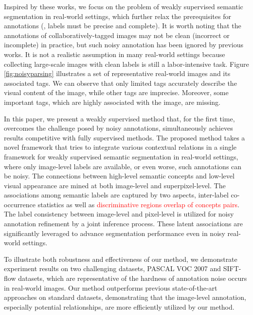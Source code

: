 Inspired by these works, we focus on the problem of weakly supervised semantic segmentation in real-world settings, which further relax the prerequisites for annotations (\eg, labels must be precise and complete). It is worth noting that the annotations of collaboratively-tagged images may not be clean (incorrect or incomplete) in practice, but such noisy annotation has been ignored by previous works. It is not a realistic assumption in many real-world settings because collecting large-scale images with clean labels is still a labor-intensive task. Figure \ref{fig:noisyparsing} illustrates a set of representative real-world images and its associated tags. We can observe that only limited tags accurately describe the visual content of the image, while other tags are imprecise. Moreover, some important tags, which are highly associated with the image, are missing.

In this paper, we present a weakly supervised method that, for the first time, overcomes the challenge posed by noisy annotations, simultaneously achieves results competitive with fully supervised methods. The proposed method takes a novel framework that tries to integrate various contextual relations in a single framework for weakly supervised semantic segmentation in real-world settings, where only image-level labels are available, or even worse, such annotations can be noisy. The connections between high-level semantic concepts and low-level visual appearance are mined at both image-level and superpixel-level. The associations among semantic labels are captured by two aspects, inter-label co-occurrence statistics as well as \textcolor{red}{discriminative regions overlap of concepts pairs}. The label consistency between image-level and pixel-level is utilized for noisy annotation refinement by a joint inference process. These latent associations are significantly leveraged to advance segmentation performance even in noisy real-world settings.

To illustrate both robustness and effectiveness of our method, we demonstrate experiment results on two challenging datasets, PASCAL VOC 2007 and SIFT-flow datasets,  which are representative of the hardness of annotation noise occurs in real-world images. Our method outperforms previous state-of-the-art approaches on standard datasets, demonstrating that the image-level annotation, especially potential relationships, are more efficiently utilized by our method.



